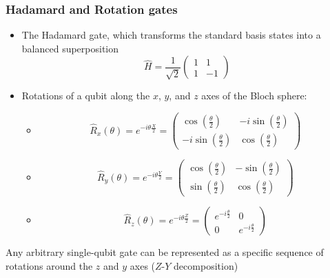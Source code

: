 \documentclass{beamer}
\begin{document}
\begin{frame}
	\frametitle{Hadamard and Rotation gates}
	\begin{itemize}
		\item The Hadamard gate, which transforms the standard basis states into a balanced superposition
		\begin{equation}
			\hat{H} = \frac{1}{\sqrt{2}} \begin{pmatrix} 
				1 & 1 \\ 
				1 & -1 
			\end{pmatrix} 
			\label{eq:hadamard_matrix}
		\end{equation}
		\item Rotations of a qubit along the $x$, $y$, and $z$ axes of the Bloch sphere:
		\begin{itemize}
			\item \begin{equation}
				\hat{R}_{x}(\theta) = e^{-i\theta\frac{X}{2}}	
				= \begin{pmatrix} 
					\cos(\frac{\theta}{2}) & -i\sin(\frac{\theta}{2}) \\ 
					-i\sin(\frac{\theta}{2}) & 	\cos(\frac{\theta}{2}) 
				\end{pmatrix} 
				\label{eq:Rx}
			\end{equation}
			\item \begin{equation}
				\hat{R}_{y}(\theta) = e^{-i\theta\frac{Y}{2}}	
				= \begin{pmatrix} 
					\cos(\frac{\theta}{2}) & -\sin(\frac{\theta}{2}) \\ 
					\sin(\frac{\theta}{2}) & 	\cos(\frac{\theta}{2}) 
				\end{pmatrix} 
				\label{eq:Ry}
			\end{equation}
			\item \begin{equation}
				\hat{R}_{z}(\theta) = e^{-i\theta\frac{Z}{2}}	
				= \begin{pmatrix} 
					e^{-i\frac{\theta}{2} } & 0 \\ 
					0 & 	e^{-i\frac{\theta}{2} } 
				\end{pmatrix} 
				\label{eq:Rz}
			\end{equation}
		\end{itemize}
	\end{itemize}
	Any arbitrary single-qubit gate can be represented as a specific sequence of rotations around the $z$ and $y$ axes ($Z$-$Y$ decomposition)

\end{frame}
\end{document}
